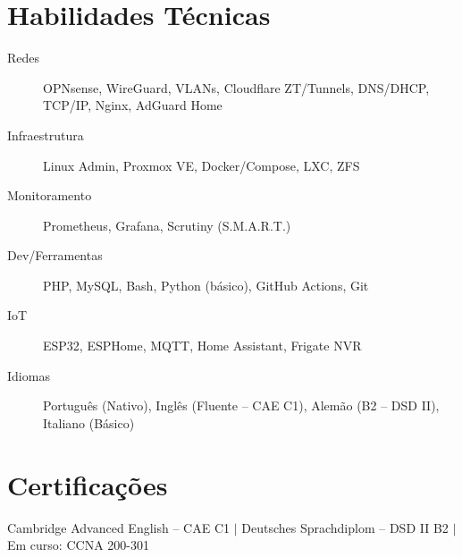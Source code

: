 \documentclass[10.5pt]{article}
\begin{document}
\section{Habilidades T\'{e}cnicas}
\begin{description}
    \item[Redes] OPNsense, WireGuard, VLANs, Cloudflare ZT/Tunnels, DNS/DHCP, TCP/IP, Nginx, AdGuard Home
    \item[Infraestrutura] Linux Admin, Proxmox VE, Docker/Compose, LXC, ZFS
    \item[Monitoramento] Prometheus, Grafana, Scrutiny (S.M.A.R.T.)
    \item[Dev/Ferramentas] PHP, MySQL, Bash, Python (b\'{a}sico), GitHub Actions, Git
    \item[IoT] ESP32, ESPHome, MQTT, Home Assistant, Frigate NVR
    \item[Idiomas] Portugu\^{e}s (Nativo), Ingl\^{e}s (Fluente -- CAE C1), Alem\~{a}o (B2 -- DSD II), Italiano (B\'{a}sico)
\end{description}

\section{Certifica\c{c}\~{o}es}
Cambridge Advanced English -- CAE C1 $|$ Deutsches Sprachdiplom -- DSD II B2 $|$ Em curso: CCNA 200-301
\end{document}
